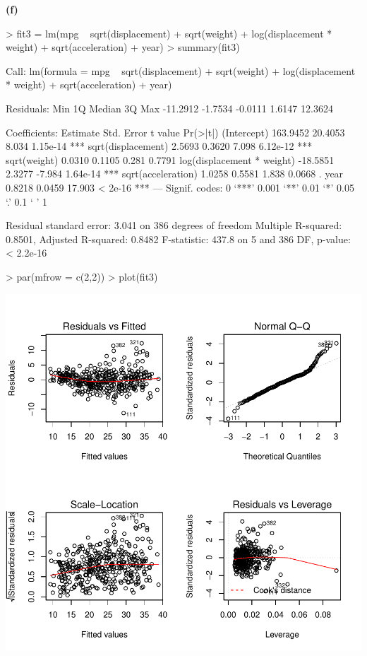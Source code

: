 \documentclass[a4paper]{article}
\renewcommand{\part}[1] {\vspace{.10in} {\bf (#1)}}
\begin{document}
\part{f}
\begin{Schunk}
\begin{Sinput}
> fit3 = lm(mpg ~ sqrt(displacement) + sqrt(weight) + log(displacement * weight)   + sqrt(acceleration) + year)
> summary(fit3)
\end{Sinput}
\begin{Soutput}
Call:
lm(formula = mpg ~ sqrt(displacement) + sqrt(weight) + log(displacement * 
    weight) + sqrt(acceleration) + year)

Residuals:
     Min       1Q   Median       3Q      Max 
-11.2912  -1.7534  -0.0111   1.6147  12.3624 

Coefficients:
                           Estimate Std. Error t value Pr(>|t|)    
(Intercept)                163.9452    20.4053   8.034 1.15e-14 ***
sqrt(displacement)           2.5693     0.3620   7.098 6.12e-12 ***
sqrt(weight)                 0.0310     0.1105   0.281   0.7791    
log(displacement * weight) -18.5851     2.3277  -7.984 1.64e-14 ***
sqrt(acceleration)           1.0258     0.5581   1.838   0.0668 .  
year                         0.8218     0.0459  17.903  < 2e-16 ***
---
Signif. codes:  0 ‘***’ 0.001 ‘**’ 0.01 ‘*’ 0.05 ‘.’ 0.1 ‘ ’ 1

Residual standard error: 3.041 on 386 degrees of freedom
Multiple R-squared:  0.8501,	Adjusted R-squared:  0.8482 
F-statistic: 437.8 on 5 and 386 DF,  p-value: < 2.2e-16
\end{Soutput}
\begin{Sinput}
> par(mfrow = c(2,2))
> plot(fit3)
\end{Sinput}
\end{Schunk}
\includegraphics{mutivariblelm-9f1}
\end{document}
